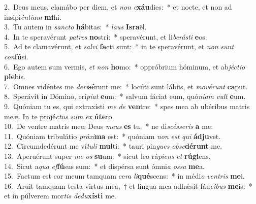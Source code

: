 {2.~}Deus meus, clamábo per diem, et \textit{non} \textit{e}\textbf{xáu}dies:~* et nocte, et non ad insipi\textit{én}\textit{ti}\textit{am} \textbf{mi}hi.\\
{3.~}Tu autem in \textit{san}\textit{cto} \textbf{há}bitas:~* \textit{laus} \textbf{Is}\textbf{ra}ël.\\
{4.~}In te speravérunt \textit{pa}\textit{tres} \textbf{no}stri:~* speravérunt, et li\textit{be}\textit{rá}\textit{sti} \textbf{e}os.\\
{5.~}Ad te clamavérunt, et \textit{sal}\textit{vi} \textbf{fa}cti sunt:~* in te speravérunt, et \textit{non} \textit{sunt} \textit{con}\textbf{fú}si.\\
{6.~}Ego autem sum vermis, \textit{et} \textit{non} \textbf{ho}mo:~* oppróbrium hóminum, et ab\textit{jé}\textit{cti}\textit{o} \textbf{ple}bis.\\
{7.~}Omnes vidéntes me \textit{de}\textit{ri}\textbf{sé}runt me:~* locúti sunt lábiis, et \textit{mo}\textit{vé}\textit{runt} \textbf{ca}put.\\
{8.~}Sperávit in Dómino, erí\textit{pi}\textit{at} \textbf{e}um:~* salvum fáciat eum, quó\textit{ni}\textit{am} \textit{vult} \textbf{e}um.\\
{9.~}Quóniam tu es, qui extraxísti \textit{me} \textit{de} \textbf{ven}tre:~* spes mea ab ubéribus matris meæ. In te projé\textit{ctus} \textit{sum} \textit{ex} \textbf{ú}\textbf{te}ro.\\
{10.~}De ventre matris meæ Deus \textit{me}\textit{us} \textbf{es} tu,~* ne di\textit{scés}\textit{se}\textit{ris} \textbf{a} me:\\
{11.~}Quóniam tribulátio \textit{pró}\textit{xi}\textbf{ma} est:~* quóniam \textit{non} \textit{est} \textit{qui} \textbf{ád}\textbf{ju}vet.\\
{12.~}Circumdedérunt me ví\textit{tu}\textit{li} \textbf{mul}ti:~* tauri pin\textit{gues} \textit{ob}\textit{se}\textbf{dé}\textbf{runt} me.\\
{13.~}Aperuérunt super \textit{me} \textit{os} \textbf{su}um:~* sicut leo rá\textit{pi}\textit{ens} \textit{et} \textbf{rú}\textbf{gi}ens.\\
{14.~}Sicut a\textit{qua} \textit{ef}\textbf{fú}sus sum:~* et dispérsa sunt ómni\textit{a} \textit{os}\textit{sa} \textbf{me}a.\\
{15.~}Factum est cor meum tamquam ce\textit{ra} \textit{li}\textbf{qué}scens:~* in médi\textit{o} \textit{ven}\textit{tris} \textbf{me}i.\\
{16.~}Aruit tamquam testa virtus mea,~† et lingua mea adhǽsit fáu\textit{ci}\textit{bus} \textbf{me}is:~* et in púlverem mor\textit{tis} \textit{de}\textit{du}\textbf{xí}\textbf{sti} me.\\
